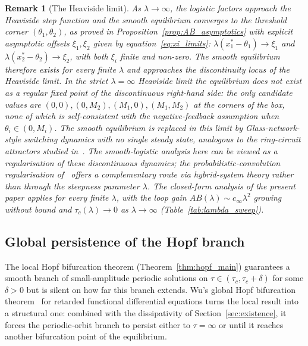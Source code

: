 \documentclass[sn-mathphys,Numbered]{sn-jnl}
\theoremstyle{thmstyleone}
\theoremstyle{thmstyletwo}
\theoremstyle{thmstylethree}
\newtheorem{remark}{Remark}
\begin{document}
\begin{remark}[The Heaviside limit]
\label{rem:heaviside}
As $\lambda\to\infty$, the logistic factors approach the Heaviside step
function and the smooth equilibrium converges to the threshold corner
$(\theta_1,\theta_2)$, as proved in Proposition~\ref{prop:AB_asymptotics}
with explicit asymptotic offsets $\xi_1,\xi_2$ given by
equation~\eqref{eq:xi_limits}: $\lambda(x_1^{*}-\theta_1)\to\xi_1$ and
$\lambda(x_2^{*}-\theta_2)\to\xi_2$, with both $\xi_i$ finite and
non-zero. The smooth equilibrium therefore exists for every finite
$\lambda$ and approaches the discontinuity locus of the Heaviside
limit. In the strict $\lambda=\infty$ Heaviside limit the equilibrium
\emph{does not exist} as a regular fixed point of the discontinuous
right-hand side: the only candidate values are
$(0,0),(0,M_2),(M_1,0),(M_1,M_2)$ at the corners of the box, none of
which is self-consistent with the negative-feedback assumption when
$\theta_i\in(0,M_i)$. The smooth equilibrium is replaced in this limit
by Glass-network-style switching dynamics with no single steady state,
analogous to the ring-circuit attractors studied
in~\cite{belgacem2025computer,farcot2019chaos}. The smooth-logistic
analysis here can be viewed as a regularisation of these
discontinuous dynamics; the probabilistic-convolution regularisation
of~\cite{belgacem2019probabilistic} offers a complementary route via
hybrid-system theory rather than through the steepness parameter
$\lambda$. The closed-form analysis of the present paper applies for
every finite $\lambda$, with the loop gain
$AB(\lambda)\sim c_\infty\lambda^2$ growing without bound and
$\tau_c(\lambda)\to 0$ as $\lambda\to\infty$
(Table~\ref{tab:lambda_sweep}).
\end{remark}

\subsection{Global persistence of the Hopf branch}
\label{sec:global_hopf}

The local Hopf bifurcation theorem (Theorem~\ref{thm:hopf_main})
guarantees a smooth branch of small-amplitude periodic solutions on
$\tau\in(\tau_c,\tau_c+\delta)$ for some $\delta>0$ but is silent on
how far this branch extends. Wu's global Hopf bifurcation
theorem~\cite{wu1998symmetric} for retarded functional differential
equations turns the local result into a structural one: combined with
the dissipativity of Section~\ref{sec:existence}, it forces the
periodic-orbit branch to persist either to $\tau=\infty$ or until it
reaches another bifurcation point of the equilibrium.
\end{document}
